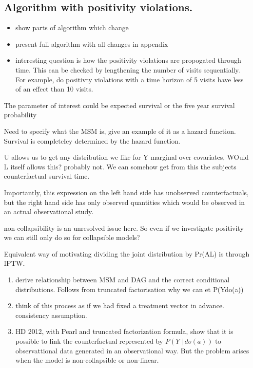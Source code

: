 \documentclass[11pt]{article}
\providecommand{\tightlist}{%
      \setlength{\itemsep}{0pt}\setlength{\parskip}{0pt}}
\begin{document}
    \subsection{Algorithm with positivity
violations.}\label{algorithm-with-positivity-violations.}

\begin{itemize}
\tightlist
\item
  show parts of algorithm which change
\item
  present full algorithm with all changes in appendix
\item
  interesting question is how the positivity violations are propogated
  through time. This can be checked by lengthening the number of visits
  sequentially. For example, do positivty violations with a time horizon
  of 5 visits have less of an effect than 10 visits.
\end{itemize}

The parameter of interest could be expected survival or the five year
survival probability

Need to specify what the MSM is, give an example of it as a hazard
function. Survival is completeley determined by the hazard function.

U allows us to get any distribution we like for Y marginal over
covariates, WOuld L itself allows this? probably not. We can somehow get
from this the subjects counterfactual survival time.

Importantly, this expression on the left hand side has unobserved
counterfactuals, but the right hand side has only observed quantities
which would be observed in an actual observational study.

non-collapsibility is an unresolved issue here. So even if we
investigate positivity we can still only do so for collapsible models?

Equivalent way of motivating dividing the joint distribution by
Pr(A\textbar{}L) is through IPTW.

\begin{enumerate}
\def\labelenumi{\arabic{enumi}.}
\item
  derive relationship between MSM and DAG and the correct conditional
  distributions. Follows from truncated factorisation why we can et
  P(Y\textbar{}do(a))
\item
  think of this process as if we had fixed a treatment vector in
  advance. consistency assumption.
\item
  HD 2012, with Pearl and truncated factorization formula, show that it
  is possible to link the counterfactual represented by
  \(P(Y\ |\ do(a))\) to observattional data generated in an
  observational way. But the problem arises when the model is
  non-collapsible or non-linear.
\end{enumerate}
\end{document}
